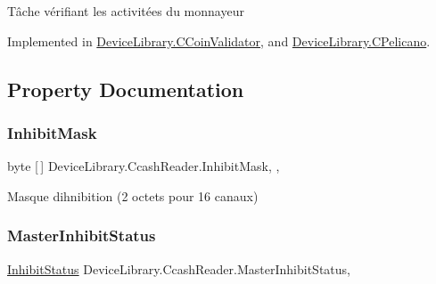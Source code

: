 Tâche vérifiant les activitées du monnayeur 



Implemented in \mbox{\hyperlink{class_device_library_1_1_c_coin_validator_a0e406f9e175eb8d295fe7406e6a948af}{Device\+Library.\+C\+Coin\+Validator}}, and \mbox{\hyperlink{class_device_library_1_1_c_pelicano_a38a0d7a675ff22773f5eb153fab9275a}{Device\+Library.\+C\+Pelicano}}.



\subsection{Property Documentation}
\mbox{\label{class_device_library_1_1_ccash_reader_a566a8b5bf9b1f377c5439f06a6d58178}} 
\subsubsection{\texorpdfstring{Inhibit\+Mask}{InhibitMask}}
{\footnotesize\ttfamily byte \mbox{[}$\,$\mbox{]} Device\+Library.\+Ccash\+Reader.\+Inhibit\+Mask\hspace{0.3cm}{\ttfamily [get]}, {\ttfamily [set]}, {\ttfamily [protected]}}



Masque d\textquotesingle{}ihnibition (2 octets pour 16 canaux) 

\mbox{\label{class_device_library_1_1_ccash_reader_ad6efa8899adedbb445d7f7cb4af0c159}} 
\subsubsection{\texorpdfstring{Master\+Inhibit\+Status}{MasterInhibitStatus}}
{\footnotesize\ttfamily \mbox{\hyperlink{class_device_library_1_1_ccash_reader_a789dcffa38ad9d646e32c448632ceaff}{Inhibit\+Status}} Device\+Library.\+Ccash\+Reader.\+Master\+Inhibit\+Status\hspace{0.3cm}{\ttfamily [get]}, {\ttfamily [protected]}}



